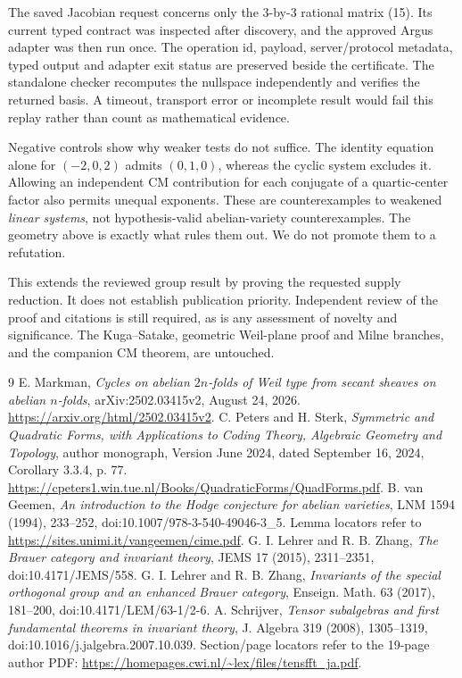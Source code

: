\documentclass[11pt]{article}
\theoremstyle{remark}
\begin{document}
The saved Jacobian request concerns only the $3$-by-$3$ rational matrix
(15). Its current typed contract was inspected after discovery, and the
approved Argus adapter was then run once. The operation id, payload,
server/protocol metadata, typed output and adapter exit status are
preserved beside the certificate. The standalone checker recomputes
the nullspace independently and verifies the returned basis. A timeout,
transport error or incomplete result would fail this replay rather than
count as mathematical evidence.

Negative controls show why weaker tests do not suffice. The identity
equation alone for $(-2,0,2)$ admits $(0,1,0)$, whereas the cyclic
system excludes it. Allowing an independent CM contribution for each
conjugate of a quartic-center factor also permits unequal exponents.
These are counterexamples to weakened \emph{linear systems}, not
hypothesis-valid abelian-variety counterexamples. The geometry above
is exactly what rules them out. We do not promote them to a refutation.

This extends the reviewed group result by proving the requested supply
reduction. It does not establish publication priority. Independent review
of the proof and citations is still required, as is any assessment of
novelty and significance. The Kuga--Satake, geometric Weil-plane proof
and Milne branches, and the companion CM theorem, are untouched.

\begin{thebibliography}{9}
E. Markman, \emph{Cycles on abelian $2n$-folds of Weil type from secant
sheaves on abelian $n$-folds}, arXiv:2502.03415v2, August 24, 2026.
\url{https://arxiv.org/html/2502.03415v2}.
C. Peters and H. Sterk, \emph{Symmetric and Quadratic Forms, with
Applications to Coding Theory, Algebraic Geometry and Topology},
author monograph, Version June 2024, dated September 16, 2024,
Corollary 3.3.4, p. 77.
\url{https://cpeters1.win.tue.nl/Books/QuadraticForms/QuadForms.pdf}.
B. van Geemen, \emph{An introduction to the Hodge conjecture for abelian
varieties}, LNM 1594 (1994), 233--252,
doi:10.1007/978-3-540-49046-3\_5.
Lemma locators refer to \url{https://sites.unimi.it/vangeemen/cime.pdf}.
G. I. Lehrer and R. B. Zhang, \emph{The Brauer category and invariant
theory}, JEMS 17 (2015), 2311--2351, doi:10.4171/JEMS/558.
G. I. Lehrer and R. B. Zhang, \emph{Invariants of the special orthogonal
group and an enhanced Brauer category}, Enseign. Math. 63 (2017),
181--200, doi:10.4171/LEM/63-1/2-6.
A. Schrijver, \emph{Tensor subalgebras and first fundamental theorems
in invariant theory}, J. Algebra 319 (2008), 1305--1319,
doi:10.1016/j.jalgebra.2007.10.039.
Section/page locators refer to the 19-page author PDF:
\url{https://homepages.cwi.nl/~lex/files/tensfft_ja.pdf}.
\end{thebibliography}
\end{document}
